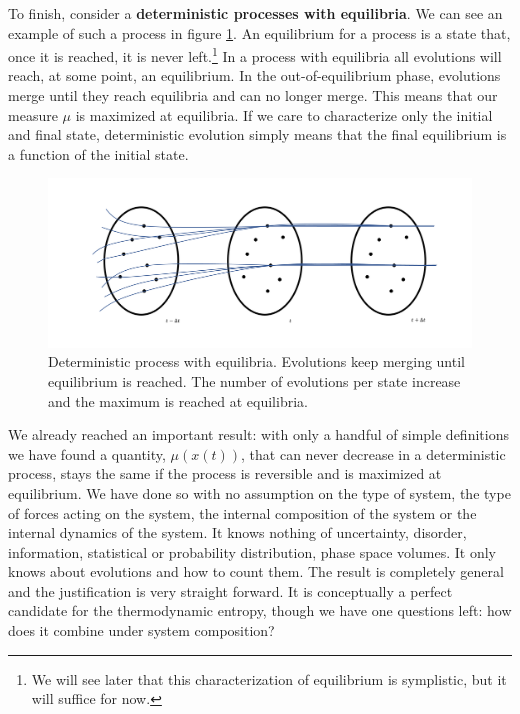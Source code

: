 \documentclass[letterpaper,twocolumn]{article}
\begin{document}
To finish, consider a \textbf{deterministic processes with equilibria}. We can see an example of such a process in figure \ref{fig_with_equilibria}. An equilibrium for a process is a state that, once it is reached, it is never left.\footnote{We will see later that this characterization of equilibrium is symplistic, but it will suffice for now.} In a process with equilibria all evolutions will reach, at some point, an equilibrium. In the out-of-equilibrium phase, evolutions merge until they reach equilibria and can no longer merge. This means that our measure $\mu$ is maximized at equilibria. If we care to characterize only the initial and final state, deterministic evolution simply means that the final equilibrium is a function of the initial state.

\begin{figure}[h]
	\includegraphics[width=\columnwidth]{images/Slide6.png}
	\caption{Deterministic process with equilibria. Evolutions keep merging until equilibrium is reached. The number of evolutions per state increase and the maximum is reached at equilibria.}\label{fig_with_equilibria}
\end{figure}

We already reached an important result: with only a handful of simple definitions we have found a quantity, $\mu(x(t))$, that can never decrease in a deterministic process, stays the same if the process is reversible and is maximized at equilibrium. We have done so with no assumption on the type of system, the type of forces acting on the system, the internal composition of the system or the internal dynamics of the system. It knows nothing of uncertainty, disorder, information, statistical or probability distribution, phase space volumes. It only knows about evolutions and how to count them. The result is completely general and the justification is very straight forward. It is conceptually a perfect candidate for the thermodynamic entropy, though we have one questions left: how does it combine under system composition?
\end{document}
